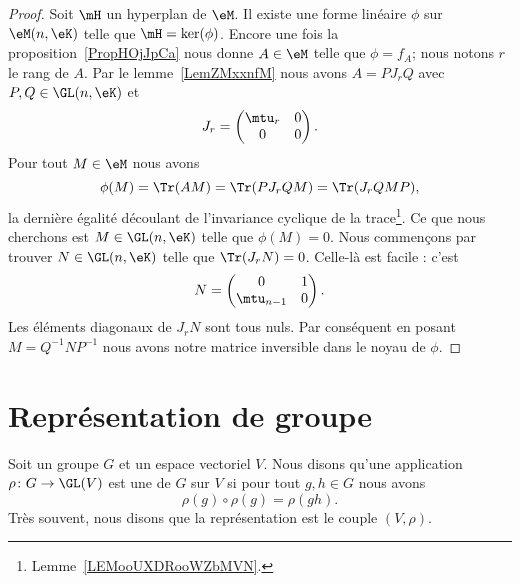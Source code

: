 \begin{proof}
    Soit \( \mH\) un hyperplan de \( \eM\). Il existe une forme linéaire \( \phi\) sur \( \eM(n,\eK)\) telle que \( \mH=\ker(\phi)\). Encore une fois la proposition~\ref{PropHOjJpCa} nous donne \( A\in \eM\) telle que \( \phi=f_A\); nous notons \( r\) le rang de \( A\). Par le lemme~\ref{LemZMxxnfM} nous avons \( A=PJ_rQ\) avec \( P,Q\in \GL(n,\eK)\) et
    \begin{equation}
        J_r=\begin{pmatrix}
            \mtu_r    &   0    \\
            0    &   0
        \end{pmatrix}.
    \end{equation}
    Pour tout \( M\in \eM\) nous avons
    \begin{equation}
        \phi(M)=\Tr(AM)=\Tr(PJ_rQM)=\Tr(J_rQMP),
    \end{equation}
la dernière égalité découlant de l'invariance cyclique de la trace\footnote{Lemme~\ref{LEMooUXDRooWZbMVN}.}. Ce que nous cherchons est \( M\in \GL(n,\eK)\) telle que \( \phi(M)=0\). Nous commençons par trouver \( N\in\GL(n,\eK)\) telle que \( \Tr(J_rN)=0\). Celle-là est facile : c'est
    \begin{equation}
        N=\begin{pmatrix}
            0    &   1    \\
            \mtu_{n-1}    &   0
        \end{pmatrix}.
    \end{equation}
    Les éléments diagonaux de \( J_rN\) sont tous nuls. Par conséquent en posant \( M=Q^{-1}NP^{-1}\) nous avons notre matrice inversible dans le noyau de \( \phi\).
\end{proof}

\section{Représentation de groupe}

\begin{definition}[Représentation]      \label{DEFooXVMSooXDIfZV}
    Soit un groupe \( G\) et un espace vectoriel \( V\). Nous disons qu'une application \( \rho\colon G\to \GL(V)\) est une  de \( G\) sur \( V\) si pour tout \( g,h\in G\) nous avons
    \begin{equation}
        \rho(g)\circ\rho(g)=\rho(gh).
    \end{equation}
    Très souvent, nous disons que la représentation est le couple \( (V,\rho)\).
\end{definition}

